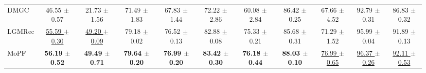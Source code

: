 \begin{table}[t]
{\begin{tabular}{lcccccccccc}
DMGC & 46.55 $\pm$ 0.57 & 21.73 $\pm$ 1.56 & 71.49 $\pm$ 1.83 & 67.83 $\pm$ 1.44 & 72.22 $\pm$ 2.86 & 60.08 $\pm$ 2.84 & 86.42 $\pm$ 0.25 & 67.66 $\pm$ 4.52 & 92.79 $\pm$ 0.31 & 86.83 $\pm$ 0.32 \\
LGMRec & \underline{55.59 $\pm$ 0.30} & \underline{49.20 $\pm$ 0.09} & 79.18 $\pm$ 0.02 & 76.52 $\pm$ 0.13 & 82.88 $\pm$ 0.08 & 75.33 $\pm$ 0.21 & 85.68 $\pm$ 0.31 & 71.29 $\pm$ 1.52 & 95.99 $\pm$ 0.04 & 91.89 $\pm$ 0.13 \\
\midrule
MoPF & \textbf{56.19 $\pm$ 0.52} & \textbf{49.49 $\pm$ 0.71} & \textbf{79.64 $\pm$ 0.20} & \textbf{76.99 $\pm$ 0.20} & \textbf{83.42 $\pm$ 0.30} & \textbf{76.18 $\pm$ 0.44} & \textbf{88.03 $\pm$ 0.10} & \underline{76.99 $\pm$ 0.65} & \underline{96.37 $\pm$ 0.26} & \underline{92.11 $\pm$ 0.53} \\
\bottomrule
\end{tabular}%
}
\end{table}
